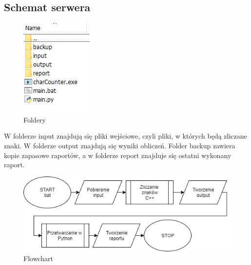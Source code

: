 \documentclass[]{article}
\begin{document}
\subsection{Schemat serwera}
\begin{figure}[H]
	\centering
	\includegraphics[width=0.4\linewidth]{folders}
	\caption{Foldery}
	\label{fig:folders}
\end{figure}
W folderze input znajdują się pliki wejściowe, czyli pliki, w których będą zliczane znaki. W folderze output znajdują się wyniki obliczeń. Folder backup zawiera kopie zapasowe raportów, a w folderze report znajduje się ostatni wykonany raport.
\begin{figure}[H]
	\centering
	\includegraphics[width=0.9\linewidth]{flowchart}
	\caption{Flowchart}
	\label{fig:flowchart}
\end{figure}
\end{document}
